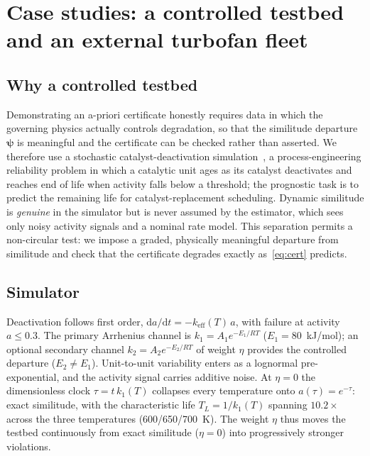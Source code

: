 \documentclass[review,times]{elsarticle}
\theoremstyle{definition}
\theoremstyle{remark}
\begin{document}
\section{Case studies: a controlled testbed and an external turbofan fleet}\label{sec:design}
\subsection{Why a controlled testbed}\label{sec:why}
Demonstrating an a-priori certificate honestly requires data in which the governing physics actually
controls degradation, so that the similitude departure $\boldsymbol\psi$ is meaningful and the
certificate can be checked rather than asserted. We therefore use a stochastic catalyst-deactivation
simulation~\cite{levenspiel1999chemical,perry2008handbook}, a process-engineering reliability problem
in which a catalytic unit ages as its catalyst deactivates and reaches end of life when activity
falls below a threshold; the prognostic task is to predict the remaining life for catalyst-replacement
scheduling. Dynamic similitude is \emph{genuine} in the simulator but is never assumed by the
estimator, which sees only noisy activity signals and a nominal rate model. This separation permits a
non-circular test: we impose a graded, physically meaningful departure from similitude and check that
the certificate degrades exactly as~\eqref{eq:cert} predicts.

\subsection{Simulator}\label{sec:sim}
Deactivation follows first order, $\mathrm{d}a/\mathrm{d}t=-k_{\mathrm{eff}}(T)\,a$, with failure at
activity $a\le0.3$. The primary Arrhenius channel is $k_1=A_1e^{-E_1/RT}$ ($E_1=80$~kJ/mol); an
optional secondary channel $k_2=A_2e^{-E_2/RT}$ of weight $\eta$ provides the controlled departure
($E_2\neq E_1$). Unit-to-unit variability enters as a lognormal pre-exponential, and the activity
signal carries additive noise. At $\eta=0$ the dimensionless clock $\tau=t\,k_1(T)$ collapses every
temperature onto $a(\tau)=e^{-\tau}$: exact similitude, with the characteristic life $T_L=1/k_1(T)$
spanning $10.2\times$ across the three temperatures (600/650/700~K). The weight $\eta$ thus moves the
testbed continuously from exact similitude ($\eta=0$) into progressively stronger violations.
\end{document}
